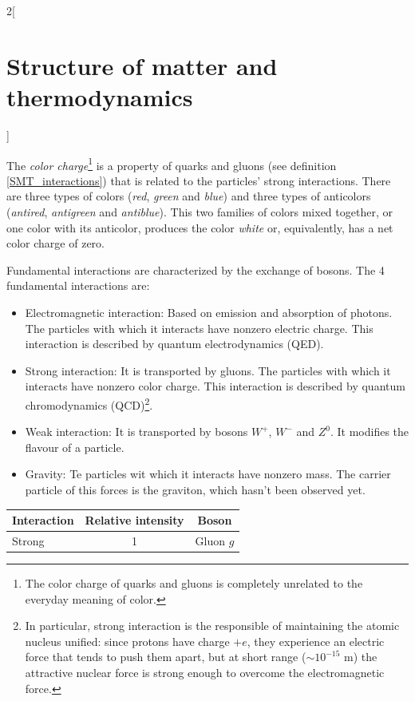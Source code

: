 \documentclass[../../../main.tex]{subfiles}
\begin{document}
\begin{multicols}{2}[\section{Structure of matter and thermodynamics}]
\begin{definition}
    The \textit{color charge}\footnote{The color charge of quarks and gluons is completely unrelated to the everyday meaning of color.} is a property of quarks and gluons (see definition \ref{SMT_interactions}) that is related to the particles' strong interactions. There are three types of colors (\textit{red}, \textit{green} and \textit{blue}) and three types of anticolors (\textit{antired}, \textit{antigreen} and \textit{antiblue}). This two families of colors mixed together, or one color with its anticolor, produces the color \textit{white} or, equivalently, has a net color charge of zero.
  \end{definition}
  \begin{definition}\label{SMT_interactions}
    Fundamental interactions are characterized by the exchange of bosons. The 4 fundamental interactions are:
    \begin{itemize}
      \item Electromagnetic interaction: Based on emission and absorption of photons. The particles with which it interacts have nonzero electric charge. This interaction is described by quantum electrodynamics (QED).
      \item Strong interaction: It is transported by gluons. The particles with which it interacts have nonzero color charge. This interaction is described by quantum chromodynamics (QCD)\footnote{In particular, strong interaction is the responsible of maintaining the atomic nucleus unified: since protons have charge $+e$, they experience an electric force that tends to push them apart, but at short range ($\sim10^{-15}\text{ m}$) the attractive nuclear force is strong enough to overcome the electromagnetic force.}.
      \item Weak interaction: It is transported by bosons $W^+$, $W^-$ and $Z^0$. It modifies the flavour of a particle.
      \item Gravity: Te particles wit which it interacts have nonzero mass. The carrier particle of this forces is the graviton, which hasn't been observed yet.
    \end{itemize}
    \begin{center}
      \begin{minipage}{\linewidth}
        \centering
        \begin{tabular}{lcc}
          \hline
          \hline
          Interaction     & Relative intensity & Boson                   \\
          \hline
          Strong          & 1                  & Gluon $g$               \\

\end{tabular}
\end{minipage}
\end{center}
\end{definition}
\end{multicols}
\end{document}
